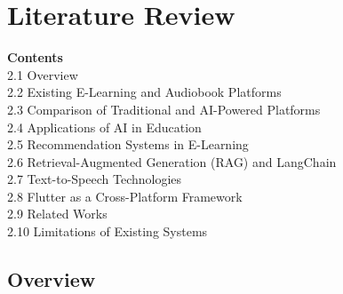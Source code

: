 \chapter{Literature Review}

\vspace{-0.5cm}
\begin{center}
\begin{minipage}{0.85\textwidth}
\small
\textbf{Contents}\\[0.3cm]
\hspace*{1cm} 2.1 \quad Overview \dotfill \pageref{sec:ch2overview}\\
\hspace*{1cm} 2.2 \quad Existing E-Learning and Audiobook Platforms \dotfill \pageref{sec:existing}\\
\hspace*{1cm} 2.3 \quad Comparison of Traditional and AI-Powered Platforms \dotfill \pageref{sec:comparison}\\
\hspace*{1cm} 2.4 \quad Applications of AI in Education \dotfill \pageref{sec:aiinedu}\\
\hspace*{1cm} 2.5 \quad Recommendation Systems in E-Learning \dotfill \pageref{sec:recsys}\\
\hspace*{1cm} 2.6 \quad Retrieval-Augmented Generation (RAG) and LangChain \dotfill \pageref{sec:rag}\\
\hspace*{1cm} 2.7 \quad Text-to-Speech Technologies \dotfill \pageref{sec:tts}\\
\hspace*{1cm} 2.8 \quad Flutter as a Cross-Platform Framework \dotfill \pageref{sec:flutter}\\
\hspace*{1cm} 2.9 \quad Related Works \dotfill \pageref{sec:related}\\
\hspace*{1cm} 2.10 \quad Limitations of Existing Systems \dotfill \pageref{sec:limitations}\\
\end{minipage}
\end{center}
\vspace{0.5cm}
\newpage

\section{Overview}
\label{sec:ch2overview}

